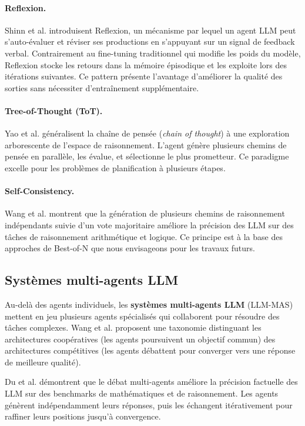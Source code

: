 \paragraph{Reflexion.}
Shinn et al. \cite{shinn2023reflexion} introduisent Reflexion, un mécanisme
par lequel un agent LLM peut s'auto-évaluer et réviser ses productions en
s'appuyant sur un signal de feedback verbal. Contrairement au fine-tuning
traditionnel qui modifie les poids du modèle, Reflexion stocke les retours
dans la mémoire épisodique et les exploite lors des itérations suivantes.
Ce pattern présente l'avantage d'améliorer la qualité des sorties sans
nécessiter d'entraînement supplémentaire.

\paragraph{Tree-of-Thought (ToT).}
Yao et al. \cite{yao2023tree} généralisent la chaîne de pensée (\textit{chain
of thought}) à une exploration arborescente de l'espace de raisonnement. L'agent
génère plusieurs chemins de pensée en parallèle, les évalue, et sélectionne le
plus prometteur. Ce paradigme excelle pour les problèmes de planification à
plusieurs étapes.

\paragraph{Self-Consistency.}
Wang et al. \cite{wang2022self} montrent que la génération de plusieurs
chemins de raisonnement indépendants suivie d'un vote majoritaire améliore
la précision des LLM sur des tâches de raisonnement arithmétique et logique.
Ce principe est à la base des approches de Best-of-N que nous envisageons
pour les travaux futurs.

\subsection{Systèmes multi-agents LLM}

Au-delà des agents individuels, les \textbf{systèmes multi-agents LLM}
(LLM-MAS) mettent en jeu plusieurs agents spécialisés qui collaborent
pour résoudre des tâches complexes. Wang et al. \cite{wang2024survey}
proposent une taxonomie distinguant les architectures coopératives
(les agents poursuivent un objectif commun) des architectures compétitives
(les agents débattent pour converger vers une réponse de meilleure qualité).

Du et al. \cite{du2023improving} démontrent que le débat multi-agents
améliore la précision factuelle des LLM sur des benchmarks de mathématiques
et de raisonnement. Les agents génèrent indépendamment leurs réponses,
puis les échangent itérativement pour raffiner leurs positions jusqu'à
convergence.

